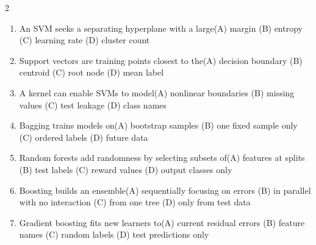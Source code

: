 \documentclass[a4paper]{article}
\begin{document}
\begin{multicols*}{2}
\begin{enumerate}
\item An SVM seeks a separating hyperplane with a large\newline\hspace*{0.6em}(A) margin \quad (B) entropy \newline\hspace*{0.6em}(C) learning rate \quad (D) cluster count
\item Support vectors are training points closest to the\newline\hspace*{0.6em}(A) decision boundary \quad (B) centroid \newline\hspace*{0.6em}(C) root node \quad (D) mean label
\item A kernel can enable SVMs to model\newline\hspace*{0.6em}(A) nonlinear boundaries \quad (B) missing values \newline\hspace*{0.6em}(C) test leakage \quad (D) class names
\item Bagging trains models on\newline\hspace*{0.6em}(A) bootstrap samples \quad (B) one fixed sample only \newline\hspace*{0.6em}(C) ordered labels \quad (D) future data
\item Random forests add randomness by selecting subsets of\newline\hspace*{0.6em}(A) features at splits \quad (B) test labels \newline\hspace*{0.6em}(C) reward values \quad (D) output classes only
\item Boosting builds an ensemble\newline\hspace*{0.6em}(A) sequentially focusing on errors \quad (B) in parallel with no interaction \newline\hspace*{0.6em}(C) from one tree \quad (D) only from test data
\item Gradient boosting fits new learners to\newline\hspace*{0.6em}(A) current residual errors \quad (B) feature names \newline\hspace*{0.6em}(C) random labels \quad (D) test predictions only

\end{enumerate}
\end{multicols*}
\end{document}
